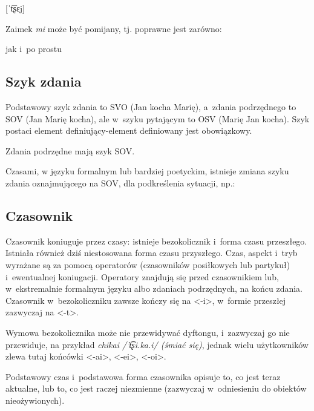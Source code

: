 \begin{spacing}{1.1}
\begin{multicols}{2}
[ˈt͡ʂɛj]

\end{multicols}

\noindent
Zaimek \emph{mi} może być pomijany, tj. poprawne jest zarówno: 


\noindent
jak i~po prostu


\subsection{Szyk zdania}

Podstawowy szyk zdania to SVO (Jan kocha Marię), a~zdania podrzędnego to SOV
(Jan Marię kocha), ale w~szyku pytającym to OSV (Marię Jan kocha). Szyk postaci
element definiujący-element definiowany jest obowiązkowy.

Zdania podrzędne mają szyk SOV.

Czasami, w języku formalnym lub bardziej poetyckim, istnieje zmiana szyku zdania
oznajmującego na SOV, dla podkreślenia sytuacji, np.:


\subsection{Czasownik}

Czasownik koniuguje przez czasy: istnieje bezokolicznik i~forma czasu
przeszłego. Istniała również dziś niestosowana forma czasu przyszłego. Czas,
aspekt i~tryb wyrażane są za pomocą operatorów (czasowników posiłkowych lub
partykuł) i~ewentualnej koniugacji. Operatory znajdują się przed czasownikiem
lub, w~ekstremalnie formalnym języku albo zdaniach podrzędnych, na końcu zdania.
Czasownik w~bezokoliczniku zawsze kończy się na <-i>, w~formie przeszłej
zazwyczaj na <-t>.

Wymowa bezokolicznika może nie przewidywać dyftongu, i~zazwyczaj go nie
przewiduje, na przykład \emph{chikai /'t͡ʂi.ka.i/ (śmiać się)}, jednak wielu
użytkowników zlewa tutaj końcówki <-ai>, <-ei>, <-oi>.

\skipline

Podstawowy czas i~podstawowa forma czasownika opisuje to, co jest teraz
aktualne, lub to, co jest raczej niezmienne (zazwyczaj w~odniesieniu do obiektów
nieożywionych).


\end{spacing}

